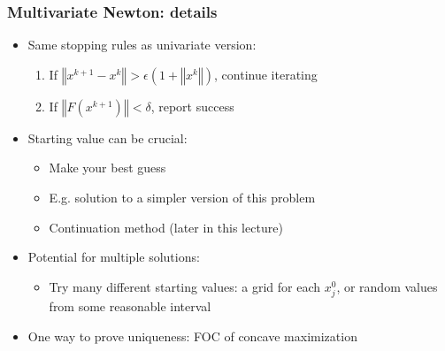 \documentclass[bigger]{beamer}
\begin{document}
\begin{frame}
\frametitle{Multivariate Newton: details}

\begin{itemize}
\item Same stopping rules as univariate version:

\begin{enumerate}
\item If $\left\Vert x^{k+1}-x^{k}\right\Vert >\epsilon (1+\left\Vert
x^{k}\right\Vert )$, continue iterating

\item If $\left\Vert F(x^{k+1})\right\Vert <\delta $, report success
\end{enumerate}

\item Starting value can be crucial:

\begin{itemize}
\item Make your best guess

\item E.g. solution to a simpler version of this problem

\item Continuation method (later in this lecture)
\end{itemize}

\item Potential for multiple solutions:

\begin{itemize}
\item Try many different starting values: a grid for each $x_{j}^{0}$, 
\newline
or random values from some reasonable interval
\end{itemize}

\item One way to prove uniqueness: FOC of concave maximization
\end{itemize}


\end{frame}%
\end{document}
